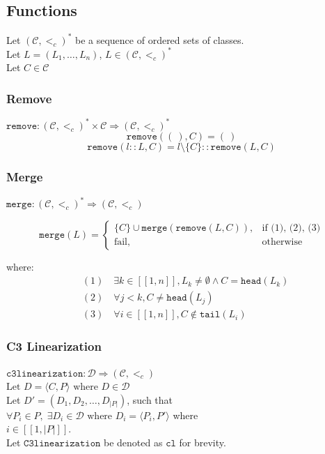 \documentclass[runningheads]{llncs}
\newcommand*{\CC}{\ensuremath{\mathcal{C}}\xspace}
\newcommand*{\DD}{\ensuremath{\mathcal{D}}\xspace}
\newcommand*{\ordCC}{\ensuremath{(\mathcal{C}, <_c)}\xspace}
\newcommand*{\cl}{\texttt{c3linearization}}
\newcommand*{\rem}{\texttt{remove}}
\newcommand*{\h}{\texttt{head}}
\newcommand*{\mer}{\texttt{merge}}
\newcommand*{\oneToN}{\ensuremath{[\![1,n]\!]}\xspace}
\begin{document}
\subsection{Functions}

Let $\ordCC^*$ be a sequence of ordered sets of classes.\\
Let $L = (L_1, \ldots , L_n)$, $L \in \ordCC^*$\\
Let $C \in \mathcal{C}$\\

\subsubsection{Remove}

$\rem : \ordCC^* \times \CC \Rightarrow \ordCC^*$\\
\[
\rem(( \ ), C) = ( \ )
\]
\[
\rem(l::L, C) = l \setminus \{C\} :: \rem(L,C)
\]

\subsubsection{Merge}
\label{sec:mergeFunctionMath}
$\mer : \ordCC^* \Rightarrow \ordCC $

\begin{equation*}
\mer(L)=
\begin{cases} 
\{C\} \cup \mer(\rem(L, C)), & \text{if (1), (2), (3)} \\
\text{fail}, & \text{otherwise}
\end{cases}
\end{equation*}

where:
\begin{align*}
&(1) \quad \exists k \in \oneToN, L_k \neq \emptyset \land C = \h(L_k) \\
&(2) \quad \forall j < k, C \neq \h(L_j) \\
&(3) \quad \forall i \in \oneToN, C \notin \texttt{tail}(L_i)
\end{align*}

\subsubsection{C3 Linearization}
$\cl: \DD \Rightarrow \ordCC$\\
$\text{Let } D = \langle C, P \rangle \text{ where } D \in \DD$\\
Let $D' = (D_1,D_2, \dots ,D_{|P|})$, such that \\
$\forall P_i \in P, \; \exists D_i \in \DD \text{ where } D_i = \langle P_i, P' \rangle$ where\\ $i \in  [\![1, |P|]\!]$.\\
Let $\texttt{C3linearization}$ be denoted as $\texttt{cl}$ for brevity.
\end{document}
